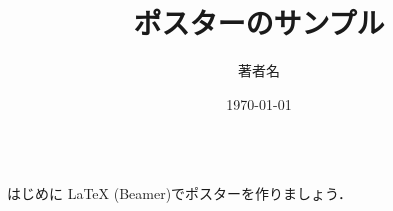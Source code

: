 \documentclass[unicode]{beamer}
\title{ポスターのサンプル}
\author{著者名}
\institute{所属機関名}
\date{\today}
\begin{document}
\begin{frame}
\begin{columns}[t]
    \begin{column}{.32\linewidth}
        \begin{block}{はじめに}
            \LaTeX{} (Beamer)でポスターを作りましょう．
        \end{block}
    \end{column}
\end{columns}
\end{frame}
\end{document}
